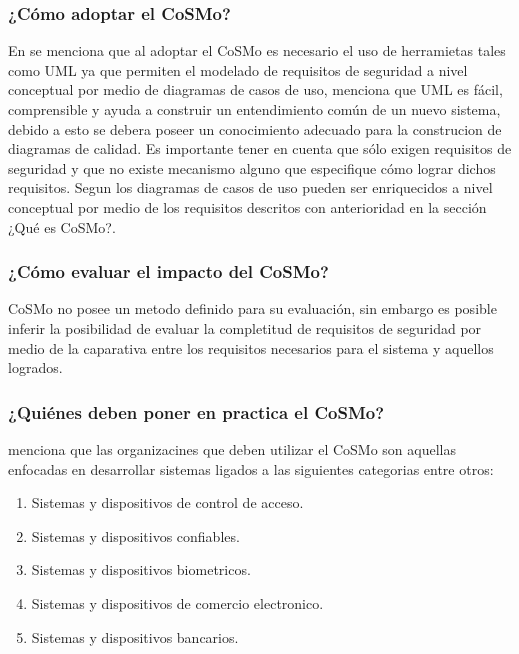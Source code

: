 \documentclass[runningheads,a4paper]{llncs}
\begin{document}
\subsubsection{¿Cómo adoptar el \gls{CoSMo}?}
En \cite{CoSMoIntroduction} se menciona que al adoptar el \gls{CoSMo} es necesario el uso de herramietas tales como \gls{UML} ya que permiten el modelado de requisitos de seguridad a nivel conceptual por medio de  diagramas de casos de uso, \cite{CoSMoIntroduction} menciona que UML es fácil, comprensible y ayuda a construir un entendimiento común de un nuevo sistema, debido a esto se debera poseer un conocimiento adecuado para la construcion de diagramas de calidad. Es importante tener en cuenta que sólo exigen requisitos de seguridad y que no existe mecanismo alguno que especifique cómo lograr dichos requisitos. Segun \cite{CoSMoIntroduction} los diagramas de casos de uso pueden ser enriquecidos a nivel conceptual por medio de los requisitos descritos con anterioridad en la sección ¿Qué es \gls{CoSMo}?.

\subsubsection{¿Cómo evaluar el impacto del \gls{CoSMo}?}
\gls{CoSMo} no posee un metodo definido para su evaluación, sin embargo es posible inferir la posibilidad de evaluar la completitud de requisitos de seguridad por medio de la caparativa entre los requisitos necesarios para el sistema y aquellos logrados.

\subsubsection{¿Quiénes deben poner en practica el \gls{CoSMo}?}
\cite{CoSMoIntroduction} menciona que las organizacines que deben utilizar el \gls{CoSMo} son aquellas enfocadas en desarrollar sistemas ligados a las siguientes categorias entre otros:\\

\begin{enumerate}
	\item Sistemas y dispositivos de control de acceso.
	\item Sistemas y dispositivos confiables.
	\item Sistemas y dispositivos biometricos.
	\item Sistemas y dispositivos de comercio electronico.
	\item Sistemas y dispositivos bancarios.
\end{enumerate}
\end{document}
